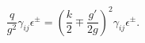 \begin{equation}
\frac{q}{g^2}\gamma_{ij}\epsilon^\pm=(\frac{k}{2}\mp\frac{g'}{2g})^2
\gamma_{ij}\epsilon^{\pm}.
\end{equation}

